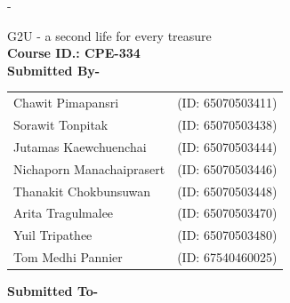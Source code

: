 \begin{titlingpage}
	\begin{SingleSpace}
		\calccentering{\unitlength}
		\begin{adjustwidth*}{\unitlength}{-\unitlength}
			\begin{center}
				{\HUGE G2U - a second life for every treasure}\\[4mm]
				\vspace{3mm}
				{\large \textbf{Course ID.: CPE-334}}\\
				\vspace{12mm}
				{\large \textbf{Submitted By-}}\\
				\begin{center}
					\begin{tabular}{@{} l l @{}}  %
						\large Chawit Pimapansri & \large (ID: 65070503411) \\
						\large Sorawit Tonpitak & \large (ID: 65070503438) \\
						\large Jutamas Kaewchuenchai & \large (ID: 65070503444) \\
						\large Nichaporn Manachaiprasert & \large (ID: 65070503446) \\
						\large Thanakit Chokbunsuwan & \large (ID: 65070503448) \\
						\large Arita Tragulmalee & \large (ID: 65070503470) \\
						\large Yuil Tripathee & \large (ID: 65070503480) \\
						\large Tom Medhi Pannier & \large (ID: 67540460025) \\
					\end{tabular}
				\end{center}
				\vspace{12mm}
				{\large \textbf{Submitted To-} }\\
				\vspace{3mm}

\end{center}
\end{adjustwidth*}
\end{SingleSpace}
\end{titlingpage}
